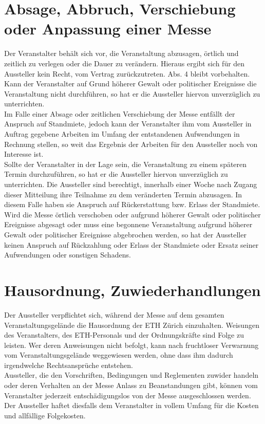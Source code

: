 \documentclass[8pt,a4paper]{article}
\begin{document}
\begin{multicols}{2}
\section{Absage, Abbruch, Verschiebung oder Anpassung einer Messe}
Der Veranstalter behält sich vor, die Veranstaltung abzusagen, örtlich und zeitlich zu verlegen oder die Dauer zu verändern. Hieraus ergibt sich für den Aussteller kein Recht, vom Vertrag zurückzutreten. Abs. 4 bleibt vorbehalten. Kann der Veranstalter auf Grund höherer Gewalt oder politischer Ereignisse die Veranstaltung nicht durchführen, so hat er die Aussteller hiervon unverzüglich zu unterrichten.\\
Im Falle einer Absage oder zeitlichen Verschiebung der Messe entfällt der Anspruch auf Standmiete, jedoch kann der Veranstalter ihm vom Aussteller in Auftrag gegebene Arbeiten im Umfang der entstandenen Aufwendungen in Rechnung stellen, so weit das Ergebnis der Arbeiten für den Aussteller noch von Interesse ist.\\
Sollte der Veranstalter in der Lage sein, die Veranstaltung zu einem späteren Termin durchzuführen, so hat er die Aussteller hiervon unverzüglich zu unterrichten. Die Aussteller sind berechtigt, innerhalb einer Woche nach Zugang dieser Mitteilung ihre Teilnahme zu dem veränderten Termin abzusagen. In diesem Falle haben sie Anspruch auf Rückerstattung bzw. Erlass der Standmiete.\\
Wird die Messe örtlich verschoben oder aufgrund höherer Gewalt oder politischer Ereignisse abgesagt oder muss eine begonnene Veranstaltung aufgrund höherer Gewalt oder politischer Ereignisse abgebrochen werden, so hat der Aussteller keinen Anspruch auf Rückzahlung oder Erlass der Standmiete oder Ersatz seiner Aufwendungen oder sonstigen Schadens.

\section{Hausordnung, Zuwiederhandlungen}
Der Aussteller verpflichtet sich, während der Messe auf dem gesamten Veranstaltungsgelände die Hausordnung der ETH Zürich einzuhalten. Weisungen des Veranstalters, des ETH-Personals und der Ordnungskräfte sind Folge zu leisten. Wer deren Anweisungen nicht befolgt, kann nach fruchtloser Verwarnung vom Veranstaltungsgelände weggewiesen werden, ohne dass ihm dadurch irgendwelche Rechtsansprüche entstehen.\\
Aussteller, die den Vorschriften, Bedingungen und Reglementen zuwider handeln oder deren Verhalten an der Messe Anlass zu Beanstandungen gibt, können vom Veranstalter jederzeit entschädigungslos von der Messe ausgeschlossen werden. Der Aussteller haftet diesfalls dem Veranstalter in vollem Umfang für die Kosten und allfällige Folgekosten.


\end{multicols}
\end{document}
